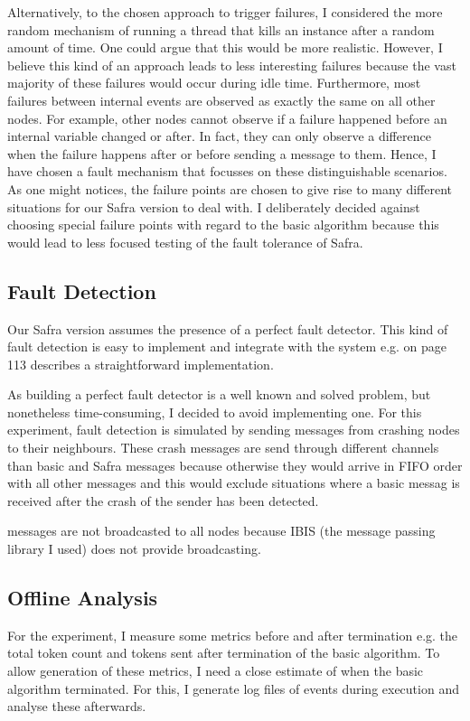 Alternatively, to the chosen approach to trigger failures, I considered the more random mechanism of running a thread that kills an instance after a random amount of time.
One could argue that this would be more realistic.
However, I believe this kind of an approach leads to less interesting failures because the vast majority of these failures would occur during idle time. 
Furthermore, most failures between internal events are observed as exactly the same on all other nodes. 
For example, other nodes cannot observe if a failure happened before an internal variable changed or after. 
In fact, they can only observe a difference when the failure happens after or before sending a message to them.
Hence, I have chosen a fault mechanism that focusses on these distinguishable scenarios.
As one might notices, the failure points are chosen to give rise to many different situations for our Safra version to deal with. 
I deliberately decided against choosing special failure points with regard to the basic algorithm because this would lead to less focused testing of the fault tolerance of Safra.

\subsection{Fault Detection}
Our Safra version assumes the presence of a perfect fault detector.
This kind of fault detection is easy to implement and integrate with the system e.g.
\cite{Fokkink:2018} on page 113 describes a straightforward implementation.

As building a perfect fault detector is a well known and solved problem, but nonetheless time-consuming, I decided to avoid implementing one.
For this experiment, fault detection is simulated by sending  messages from crashing nodes to their neighbours. 
These crash messages are send through different channels than basic and Safra messages because otherwise they would arrive in FIFO order with all other messages and this would exclude situations where a basic messag is received after the crash of the sender has been detected.

 messages are not broadcasted to all nodes because IBIS (the message passing library I used) does not provide broadcasting.


\subsection{Offline Analysis}
\label{ssec:offline-analysis}
For the experiment, I measure some metrics before and after termination e.g. the total token count and tokens sent after termination of the basic algorithm.
To allow generation of these metrics, I need a close estimate of when the basic algorithm terminated.
For this, I generate log files of events during execution and analyse these afterwards.

